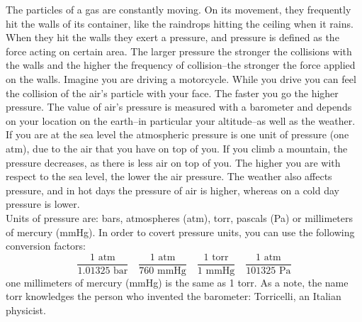 \documentclass[main.tex]{subfiles}
\begin{document}
\begin{description}
The particles of a gas are constantly moving. On its movement, they frequently hit the walls of its container, like the raindrops hitting the ceiling when it rains. When they hit the walls they exert a pressure, and pressure is defined as the force acting on certain area. The larger pressure the stronger the collisions with the walls and the higher the frequency of collision--the stronger the force applied on the walls. Imagine you are driving a motorcycle. While you drive you can feel the collision of the air's particle with your face. The faster you go the higher pressure. 
The value of air's pressure is measured with a barometer and depends on your location on the earth--in particular your altitude--as well as the weather. If you are at the sea level the atmospheric pressure is one unit of pressure (one atm), due to the air that you have on top of you. If you climb a mountain, the pressure decreases, as there is less air on top of you. The higher you are with respect to the sea level, the lower the air pressure. The weather also affects pressure, and in hot days the pressure of air is higher, whereas on a cold day pressure is lower. \\
Units of pressure are: bars, atmospheres (atm), torr, pascals (Pa) or millimeters of mercury (mmHg). In order to covert pressure units, you can use the following conversion factors:%
\begin{equation*}
\boxed{   \frac{1 \text{ atm} }{1.01325\text{ bar} }}\quad    \boxed{ \frac{1 \text{ atm} }{760\text{ mmHg} }}\quad  \boxed{ \frac{1\text{ torr}}{1\text{ mmHg}}}\quad  \boxed{ \frac{1\text{ atm}}{101325\text{ Pa}}}   
\end{equation*}
one millimeters of mercury (mmHg) is the same as 1 torr. As a note, the name torr knowledges the person who invented the barometer: Torricelli, an Italian physicist.



\end{description}
\end{document}
